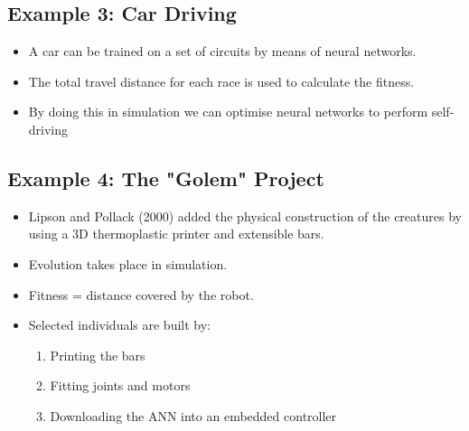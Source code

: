 \subsection*{Example 3: Car Driving}
\begin{itemize}
    \item A car can be trained on a set of circuits by means of neural networks.
    \item The total travel distance for each race is used to calculate the fitness.
    \item By doing this in simulation we can optimise neural networks to perform self-driving
\end{itemize}

\subsection*{Example 4: The "Golem" Project}
\begin{itemize}
    \item Lipson and Pollack (2000) added the physical construction of the creatures by using a 3D thermoplastic printer and extensible bars.
    \item Evolution takes place in simulation.
    \item Fitness = distance covered by the robot.
    \item Selected individuals are built by:
        \begin{enumerate}
            \item Printing the bars
            \item Fitting joints and motors
            \item Downloading the ANN into an embedded controller
        \end{enumerate}
\end{itemize}

